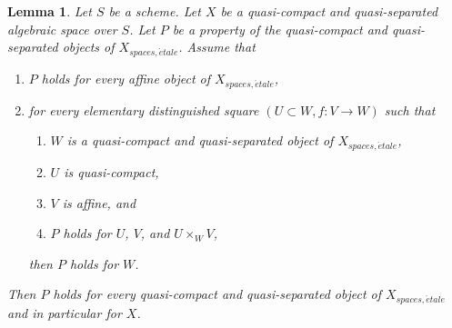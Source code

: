 \documentclass{amsart}
\theoremstyle{plain}
\newtheorem{lemma}[subsection]{Lemma}
\theoremstyle{definition}
\theoremstyle{remark}
\numberwithin{equation}{subsection}
\def\etale{{\acute{e}tale}}
\begin{document}
\begin{lemma}
\label{lemma-induction-principle}
Let $S$ be a scheme. Let $X$ be a quasi-compact and quasi-separated
algebraic space over $S$. Let $P$ be a property of the quasi-compact
and quasi-separated objects of $X_{spaces, \etale}$. Assume that
\begin{enumerate}
\item $P$ holds for every affine object of $X_{spaces, \etale}$,
\item for every elementary distinguished square $(U \subset W, f : V \to W)$
such that
\begin{enumerate}
\item $W$ is a quasi-compact and quasi-separated object of
$X_{spaces, \etale}$,
\item $U$ is quasi-compact,
\item $V$ is affine, and
\item $P$ holds for $U$, $V$, and $U \times_W V$,
\end{enumerate}
then $P$ holds for $W$.
\end{enumerate}
Then $P$ holds for every quasi-compact and quasi-separated object
of $X_{spaces, \etale}$ and in particular for $X$.
\end{lemma}
\end{document}
